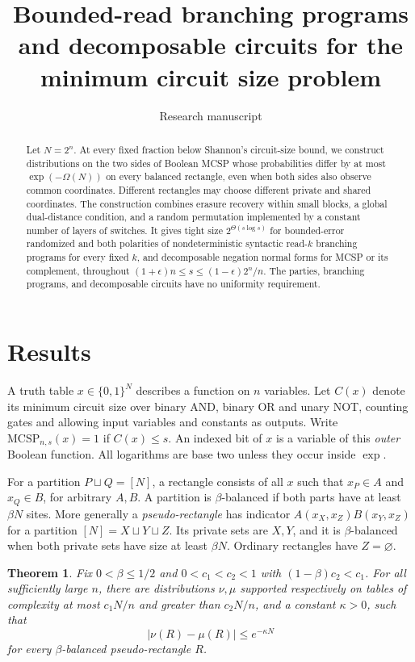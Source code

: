 \documentclass[11pt]{article}
\title{Bounded-read branching programs and decomposable circuits for the minimum circuit size problem}
\author{Research manuscript}
\date{}
\newtheorem{theorem}{Theorem}[section]
\newcommand{\mc}{\mathrm{MCSP}}
\begin{document}
\maketitle
\begin{abstract}
Let $N=2^n$. At every fixed fraction below Shannon's circuit-size bound, we construct distributions on the two sides of Boolean MCSP whose probabilities differ by at most $\exp(-\Omega(N))$ on every balanced rectangle, even when both sides also observe common coordinates. Different rectangles may choose different private and shared coordinates. The construction combines erasure recovery within small blocks, a global dual-distance condition, and a random permutation implemented by a constant number of layers of switches. It gives tight size $2^{\Theta(s\log s)}$ for bounded-error randomized and both polarities of nondeterministic syntactic read-$k$ branching programs for every fixed $k$, and decomposable negation normal forms for MCSP or its complement, throughout $(1+\epsilon)n\le s\le(1-\epsilon)2^n/n$. The parties, branching programs, and decomposable circuits have no uniformity requirement.
\end{abstract}

\section{Results}

A truth table $x\in\{0,1\}^{N}$ describes a function on $n$ variables. Let $C(x)$ denote its minimum circuit size over binary AND, binary OR and unary NOT, counting gates and allowing input variables and constants as outputs. Write $\mc_{n,s}(x)=1$ if $C(x)\le s$. An indexed bit of $x$ is a variable of this \emph{outer} Boolean function. All logarithms are base two unless they occur inside $\exp$.

For a partition $P\sqcup Q=[N]$, a rectangle consists of all $x$ such that $x_P\in A$ and $x_Q\in B$, for arbitrary $A,B$. A partition is $\beta$-balanced if both parts have at least $\beta N$ sites. More generally a \emph{pseudo-rectangle} has indicator $A(x_X,x_Z)B(x_Y,x_Z)$ for a partition $[N]=X\sqcup Y\sqcup Z$. Its private sets are $X,Y$, and it is $\beta$-balanced when both private sets have size at least $\beta N$. Ordinary rectangles have $Z=\varnothing$.

\begin{theorem}\label{t:rect}
Fix $0<\beta\le1/2$ and $0<c_1<c_2<1$ with $(1-\beta)c_2<c_1$. For all sufficiently large $n$, there are distributions $\nu,\mu$ supported respectively on tables of complexity at most $c_1N/n$ and greater than $c_2N/n$, and a constant $\kappa>0$, such that
\[
   |\nu(R)-\mu(R)|\le e^{-\kappa N}
\]
for every $\beta$-balanced pseudo-rectangle $R$.
\end{theorem}
\end{document}
